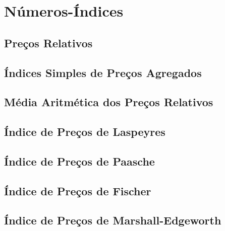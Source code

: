\documentclass[
]{book}
\begin{document}
\hypertarget{nuxfameros-uxedndices}{%
\chapter{Números-Índices}\label{nuxfameros-uxedndices}}

\hypertarget{preuxe7os-relativos}{%
\section{Preços Relativos}\label{preuxe7os-relativos}}

\hypertarget{uxedndices-simples-de-preuxe7os-agregados}{%
\section{Índices Simples de Preços Agregados}\label{uxedndices-simples-de-preuxe7os-agregados}}

\hypertarget{muxe9dia-aritmuxe9tica-dos-preuxe7os-relativos}{%
\section{Média Aritmética dos Preços Relativos}\label{muxe9dia-aritmuxe9tica-dos-preuxe7os-relativos}}

\hypertarget{uxedndice-de-preuxe7os-de-laspeyres}{%
\section{Índice de Preços de Laspeyres}\label{uxedndice-de-preuxe7os-de-laspeyres}}

\hypertarget{uxedndice-de-preuxe7os-de-paasche}{%
\section{Índice de Preços de Paasche}\label{uxedndice-de-preuxe7os-de-paasche}}

\hypertarget{uxedndice-de-preuxe7os-de-fischer}{%
\section{Índice de Preços de Fischer}\label{uxedndice-de-preuxe7os-de-fischer}}

\hypertarget{uxedndice-de-preuxe7os-de-marshall-edgeworth}{%
\section{Índice de Preços de Marshall-Edgeworth}\label{uxedndice-de-preuxe7os-de-marshall-edgeworth}}
\end{document}
